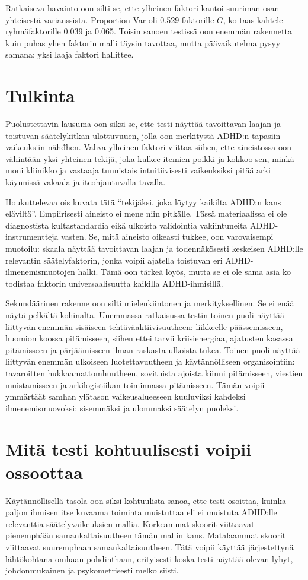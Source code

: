 \documentclass[11pt,a4paper]{article}
\begin{document}
Ratkaiseva havainto oon silti se, ette ylheinen faktori kantoi suuriman osan yhteisestä varianssista. Proportion Var oli 0.529 faktorille $G$, ko taas kahtele ryhmäfaktorille 0.039 ja 0.065. Toisin sanoen testissä oon enemmän rakennetta kuin puhas yhen faktorin malli täysin tavottaa, mutta päävaikutelma pysyy samana: yksi laaja faktori hallittee.

\section{Tulkinta}
Puolustettavin lausuma oon siksi se, ette testi näyttää tavoittavan laajan ja toistuvan säätelykitkan ulottuvuuen, jolla oon merkitystä ADHD:n tapasiin vaikeuksiin nähđhen. Vahva ylheinen faktori viittaa siihen, ette aineistossa oon vähintään yksi yhteinen tekijä, joka kulkee itemien poikki ja kokkoo sen, minkä moni kliinikko ja vastaaja tunnistais intuitiivisesti vaikeuksiksi pitää arki käynnissä vakaala ja iteohjautuvalla tavalla.

Houkuttelevaa ois kuvata tätä ``tekijäksi, joka löytyy kaikilta ADHD:n kans eläviltä''. Empiirisesti aineisto ei mene niin pitkälle. Tässä materiaalissa ei ole diagnostista kultastandardia eikä ulkoista validointia vakiintuneita ADHD-instrumentteja vasten. Se, mitä aineisto oikeasti tukkee, oon varovaisempi muotoilu: skaala näyttää tavoittavan laajan ja todennäkösesti keskeisen ADHD:lle relevantin säätelyfaktorin, jonka voipii ajatella toistuvan eri ADHD-ilmenemismuotojen halki. Tämä oon tärkeä löyös, mutta se ei ole sama asia ko todistaa faktorin universaalisuutta kaikilla ADHD-ihmisillä.

Sekundäärinen rakenne oon silti mielenkiintonen ja merkityksellinen. Se ei enää näytä pelkältä kohinalta. Uuemmassa ratkaisussa testin toinen puoli näyttää liittyvän enemmän sisäiseen tehtäväaktiivisuutheen: liikkeelle päässemisseen, huomion koossa pitämisseen, siihen ettei tarvii kriisienergiaa, ajatusten kasassa pitämisseen ja pärjäämisseen ilman raskasta ulkoista tukea. Toinen puoli näyttää liittyvän enemmän ulkoiseen luotettavuutheen ja käytännölliseen organisointiin: tavaroitten hukkaamattomhuutheen, sovituista ajoista kiinni pitämisseen, viestien muistamisseen ja arkilogistiikan toiminnassa pitämisseen. Tämän voipii ymmärtäät samhan ylätason vaikeusalueeseen kuuluviksi kahdeksi ilmenemismuovoksi: sisemmäksi ja ulommaksi säätelyn puoleksi.

\section{Mitä testi kohtuulisesti voipii ossoottaa}
Käytännöllisellä tasola oon siksi kohtuulista sanoa, ette testi osoittaa, kuinka paljon ihmisen itse kuvaama toiminta muistuttaa eli ei muistuta ADHD:lle relevanttia säätelyvaikeuksien mallia. Korkeammat skoorit viittaavat pienemphään samankaltaisuutheen tämän mallin kans. Matalaammat skoorit viittaavat suuremphaan samankaltaisuutheen. Tätä voipii käyttää järjestettynä lähtökohtana omhaan pohdinthaan, erityisesti koska testi näyttää olevan lyhyt, johdonmukainen ja psykometrisesti melko siisti.
\end{document}
